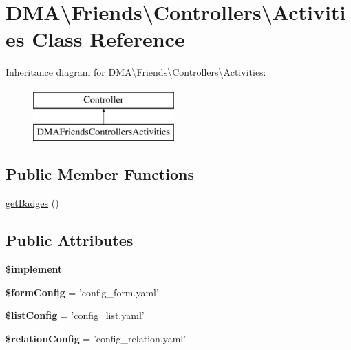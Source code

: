 \hypertarget{classDMA_1_1Friends_1_1Controllers_1_1Activities}{\section{D\+M\+A\textbackslash{}Friends\textbackslash{}Controllers\textbackslash{}Activities Class Reference}
\label{classDMA_1_1Friends_1_1Controllers_1_1Activities}
}
Inheritance diagram for D\+M\+A\textbackslash{}Friends\textbackslash{}Controllers\textbackslash{}Activities\+:\begin{figure}[H]
\begin{center}
\leavevmode
\includegraphics[height=2.000000cm]{d4/d37/classDMA_1_1Friends_1_1Controllers_1_1Activities}
\end{center}
\end{figure}
\subsection*{Public Member Functions}
\begin{DoxyCompactItemize}
\item 
\hyperlink{classDMA_1_1Friends_1_1Controllers_1_1Activities_a948fafcbcdac79c1851667216cee1e66}{get\+Badges} ()
\end{DoxyCompactItemize}
\subsection*{Public Attributes}
\begin{DoxyCompactItemize}
\item 
{\bfseries \$implement}
\item 
\hypertarget{classDMA_1_1Friends_1_1Controllers_1_1Activities_a05bd364a981c519d8288a80a0bf816d7}{{\bfseries \$form\+Config} = 'config\+\_\+form.\+yaml'}\label{classDMA_1_1Friends_1_1Controllers_1_1Activities_a05bd364a981c519d8288a80a0bf816d7}

\item 
\hypertarget{classDMA_1_1Friends_1_1Controllers_1_1Activities_ac9c246da820ff83a1c0ffe831421d26f}{{\bfseries \$list\+Config} = 'config\+\_\+list.\+yaml'}\label{classDMA_1_1Friends_1_1Controllers_1_1Activities_ac9c246da820ff83a1c0ffe831421d26f}

\item 
\hypertarget{classDMA_1_1Friends_1_1Controllers_1_1Activities_a816d7d22813eaf0145186ec3ea447bf0}{{\bfseries \$relation\+Config} = 'config\+\_\+relation.\+yaml'}\label{classDMA_1_1Friends_1_1Controllers_1_1Activities_a816d7d22813eaf0145186ec3ea447bf0}

\end{DoxyCompactItemize}


